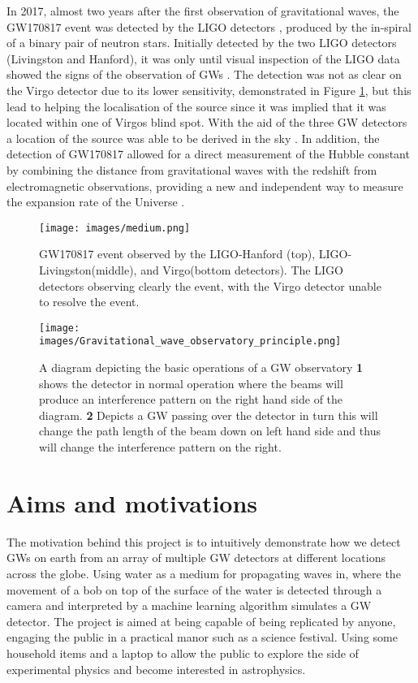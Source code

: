In 2017, almost two years after the first observation of gravitational waves, the GW170817 event was detected by the LIGO detectors \cite{Cannon_2012}, produced by the in-spiral of a binary pair of neutron stars. Initially detected by the two LIGO detectors (Livingston and Hanford), it was only until visual inspection of the LIGO data showed the signs of the observation of GWs \cite{Abbott_2017}. The detection was not as clear on the Virgo detector due to its lower sensitivity, demonstrated in Figure \ref{fig:GW170817}, but this lead to helping the localisation of the source since it was implied that it was located within one of Virgos blind spot. With the aid of the three GW detectors a location of the source was able to be derived in the sky \cite{PhysRevLett.119.161101}. In addition, the detection of GW170817 allowed for a direct measurement of the Hubble constant by combining the distance from gravitational waves with the redshift from electromagnetic observations, providing a new and independent way to measure the expansion rate of the Universe \cite{Abbott2017}.

\begin{figure}[h!]
    \centering
    \texttt{[image: images/medium.png]}
    \caption{GW170817 event observed by the LIGO-Hanford (top), LIGO-Livingston(middle), and Virgo(bottom detectors). The LIGO detectors observing clearly the event, with the Virgo detector unable to resolve the event. \cite{Abbott_2017}}
    \label{fig:GW170817}
\end{figure}


\begin{figure}[h!]
\caption{A diagram depicting the basic operations of a GW observatory \cite{noauthor_ligo_2025} \textbf{1} shows the detector in normal operation where the beams will produce an interference pattern on the right hand side of the diagram. \textbf{2} Depicts a GW passing over the detector in turn this will change the path length of the beam down on left hand side and thus will change the interference pattern on the right.
\label{fig:GWobservatory}}
{\texttt{[image: images/Gravitational\_wave\_observatory\_principle.png]}}
\end{figure}

\section{Aims and motivations}

The motivation behind this project is to intuitively demonstrate how we detect GWs on earth from an array of multiple GW detectors at different locations across the globe. Using water as a medium for propagating waves in, where the movement of a bob on top of the surface of the water is detected through a camera and interpreted by a machine learning algorithm simulates a GW detector. The project is aimed at being capable of being replicated by anyone, engaging the public in a practical manor such as a science festival. Using some household items and a laptop to allow the public to explore the side of experimental physics and become interested in astrophysics. 

